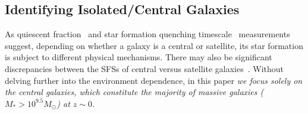 \documentclass[preprint2,tighten]{aastex62}
\begin{document}
\subsection{Identifying Isolated/Central Galaxies} \label{sec:central}
As quiescent fraction~\citep[\emph{e.g.}][]{baldry2006,peng2010,hahn2015}
and star formation quenching timescale~\citep{wetzel2013,hahn2017} 
measurements suggest, depending on whether a galaxy is a central or satellite, 
its star formation is subject to different physical mechanisms. There may 
also be significant discrepancies between the SFSs of central versus
satellite galaxies~\citep{wang2018}. Without delving further into the 
environment dependence, in this paper \emph{we focus solely on the 
central galaxies, which constitute the majority of massive galaxies 
($M_* > 10^{9.5}M_\odot$) at $z \sim 0$}. 
\end{document}
